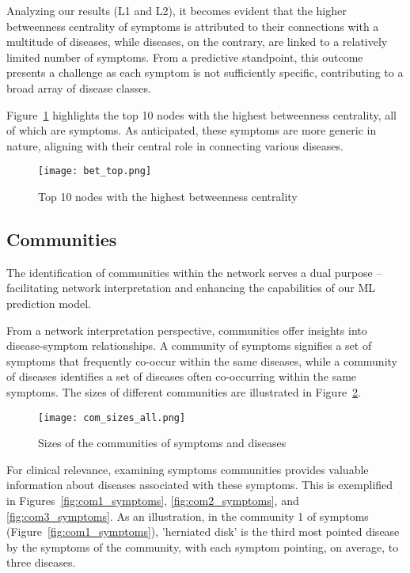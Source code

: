 Analyzing our results (L1 and L2), it becomes evident that the higher betweenness centrality of symptoms is attributed 
to their connections with a multitude of diseases, while diseases, on the contrary, are linked to a relatively limited 
number of symptoms. From a predictive standpoint, this outcome presents a challenge as each symptom is not sufficiently 
specific, contributing to a broad array of disease classes.

Figure~\ref{fig:bet_top} highlights the top 10 nodes with the highest betweenness centrality, all of which are symptoms. 
As anticipated, these symptoms are more generic in nature, aligning with their central role in connecting various diseases.

\begin{figure}[H]
    \centering
    \texttt{[image: bet\_top.png]}
    \caption{Top 10 nodes with the highest betweenness centrality}
    \label{fig:bet_top}
\end{figure}


\subsection{Communities}

The identification of communities within the network serves a dual purpose – facilitating network interpretation 
and enhancing the capabilities of our ML prediction model.

From a network interpretation perspective, communities offer insights into disease-symptom relationships. 
A community of symptoms signifies a set of symptoms that frequently co-occur within the same diseases, while a 
community of diseases identifies a set of diseases often co-occurring within the same symptoms. The sizes of 
different communities are illustrated in Figure~\ref{fig:com_sizes_all}.

\begin{figure}[H]
    \centering
    \texttt{[image: com\_sizes\_all.png]}
    \caption{Sizes of the communities of symptoms and diseases}
    \label{fig:com_sizes_all}
\end{figure}

For clinical relevance, examining symptoms communities provides valuable information about diseases associated 
with these symptoms. This is exemplified in Figures~\ref{fig:com1_symptoms}, \ref{fig:com2_symptoms}, 
and \ref{fig:com3_symptoms}. As an illustration, in the community 1 of symptoms (Figure~\ref{fig:com1_symptoms}), 
'herniated disk' is the third most pointed disease by the symptoms of the community, with each symptom pointing, 
on average, to three diseases.

